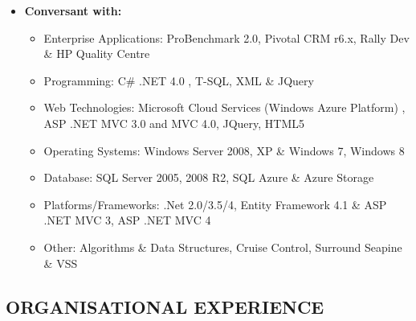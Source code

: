 \documentclass[]{article}
\begin{document}
\begin{itemize}
\item
  \textbf{Conversant with:}

  \begin{itemize}
  \itemsep1pt\parskip0pt
  \item
    Enterprise Applications: ProBenchmark 2.0, Pivotal CRM r6.x, Rally
    Dev \& HP Quality Centre
  \item
    Programming: C\# .NET 4.0 , T-SQL, XML \& JQuery
  \item
    Web Technologies: Microsoft Cloud Services (Windows Azure Platform)
    , ASP .NET MVC 3.0 and MVC 4.0, JQuery, HTML5
  \item
    Operating Systems: Windows Server 2008, XP \& Windows 7, Windows 8
  \item
    Database: SQL Server 2005, 2008 R2, SQL Azure \& Azure Storage
  \item
    Platforms/Frameworks: .Net 2.0/3.5/4, Entity Framework 4.1 \& ASP
    .NET MVC 3, ASP .NET MVC 4
  \item
    Other: Algorithms \& Data Structures, Cruise Control, Surround
    Seapine \& VSS
  \end{itemize}
\end{itemize}

\subsection{ORGANISATIONAL EXPERIENCE}\label{organisational-experience}
\end{document}
